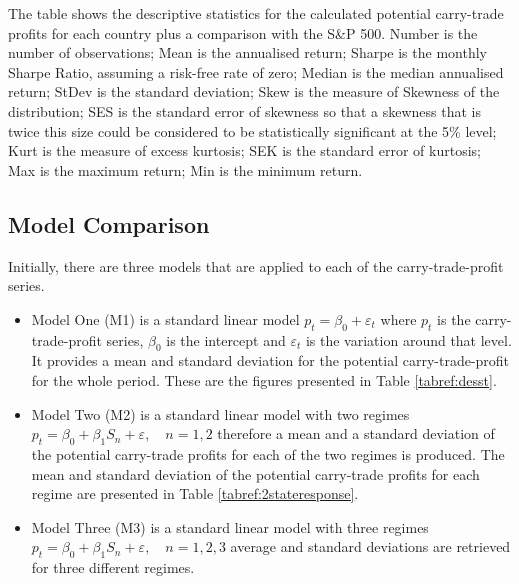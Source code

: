 \documentclass[12pt, a4paper, oneside]{article}\usepackage[]{graphicx}\usepackage[]{color}
\begin{document}
\begin{sidewaystable}[p]
\begin{threeparttable}
\begin{tabular}{lrrrrrrrrrrr}
\end{tabular}
\begin{tablenotes}
\small 
\item The table shows the descriptive statistics for the calculated potential carry-trade profits for each country plus a comparison with the S\&P 500. Number is the number of observations; Mean is the annualised return; Sharpe is the monthly Sharpe Ratio, assuming a risk-free rate of zero; Median is the median annualised return; StDev is the standard deviation; Skew is the measure of Skewness of the distribution; SES is the standard error of skewness so that a skewness that is twice this size could be considered to be statistically significant at the 5\% level; Kurt is the measure of excess kurtosis; SEK is the standard error of kurtosis; Max is the maximum return; Min is the minimum return. 
\end{tablenotes}
\caption{Descriptive statistics of potential carry-trade profits}
\label{tabref:desst}
\end{threeparttable}
\end{sidewaystable}

\subsection{Model Comparison}
Initially, there are three models that are applied to each of the carry-trade-profit series. 
\begin{itemize}
\item Model One (M1) is a standard linear model $p_t = \beta_0  + \varepsilon_t$ where $p_t$ is the carry-trade-profit series, $\beta_0$ is the intercept and $\varepsilon_t$ is the variation around that level.  It provides a mean and standard deviation for the potential carry-trade-profit for the whole period.  These are the figures presented in Table \ref{tabref:desst}.
\item Model Two (M2) is a standard linear model with two regimes $p_t = \beta_0 + \beta_1 S_n + \varepsilon, \quad n = 1, 2$ therefore a mean and a standard deviation of the potential carry-trade profits for each of the two regimes is produced.  The mean and standard deviation of the potential carry-trade profits for each regime are presented in Table \ref{tabref:2stateresponse}.
\item Model Three (M3) is a standard linear model with three regimes $p_t = \beta_0 + \beta_1 S_n + \varepsilon, \quad n = 1, 2, 3$ average and standard deviations are retrieved for three different regimes. 
\end{itemize}
\end{document}
